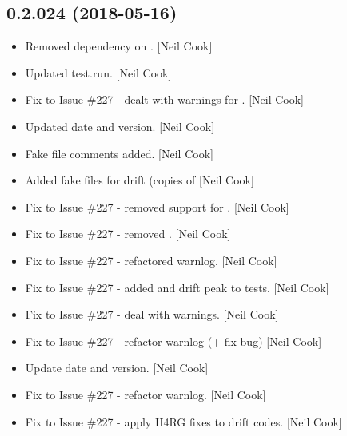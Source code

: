 \documentclass[a4paper,10pt,english]{report}
\begin{document}
\subsection{0.2.024 (2018-05-16)}
\label{\detokenize{misc/changelog:id436}}\begin{itemize}
\item {} 
Removed dependency on . {[}Neil Cook{]}

\item {} 
Updated test.run. {[}Neil Cook{]}

\item {} 
Fix to Issue \#227 - dealt with warnings for . {[}Neil Cook{]}

\item {} 
Updated date and version. {[}Neil Cook{]}

\item {} 
Fake file comments added. {[}Neil Cook{]}

\item {} 
Added fake  files for drift (copies of  {[}Neil Cook{]}

\item {} 
Fix to Issue \#227 - removed support for . {[}Neil
Cook{]}

\item {} 
Fix to Issue \#227 - removed . {[}Neil Cook{]}

\item {} 
Fix to Issue \#227 - refactored warnlog. {[}Neil Cook{]}

\item {} 
Fix to Issue \#227 - added  and drift peak to tests. {[}Neil
Cook{]}

\item {} 
Fix to Issue \#227 - deal with warnings. {[}Neil Cook{]}

\item {} 
Fix to Issue \#227 - refactor warnlog (+ fix bug) {[}Neil Cook{]}

\item {} 
Update date and version. {[}Neil Cook{]}

\item {} 
Fix to Issue \#227 - refactor warnlog. {[}Neil Cook{]}

\item {} 
Fix to Issue \#227 - apply H4RG fixes to drift codes. {[}Neil Cook{]}


\end{itemize}
\end{document}
